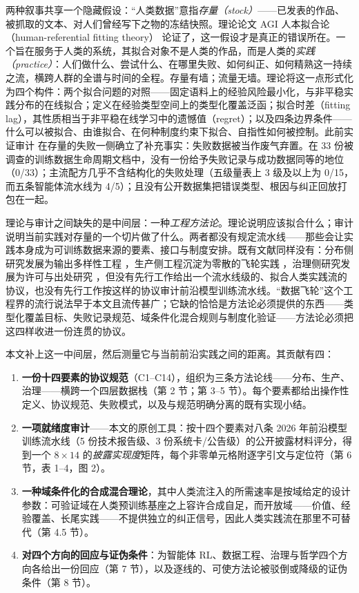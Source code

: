 \documentclass[10pt,fontset=fandol]{ctexart}
\begin{document}
两种叙事共享一个隐藏假设：“人类数据”意指\emph{存量（stock）}——已发表的作品、被抓取的文本、对人们曾经写下之物的冻结快照。理论论文 AGI 人本拟合论（human-referential fitting theory）\cite{ref5} 论证了，这一假设才是真正的错误所在。一个旨在服务于人类的系统，其拟合对象不是人类的作品，而是人类的\emph{实践（practice）}：人们做什么、尝试什么、在哪里失败、如何纠正、如何精熟这一持续之流，横跨人群的全谱与时间的全程。存量有墙；流量无墙。理论将这一点形式化为四个构件：两个拟合问题的对照——固定语料上的经验风险最小化，与非平稳实践分布的在线拟合；定义在经验类型空间上的类型化覆盖泛函；拟合时差（fitting lag），其性质相当于非平稳在线学习中的遗憾值（regret）；以及四条边界条件——什么可以被拟合、由谁拟合、在何种制度约束下拟合、自指性如何被控制。此前实证审计 \cite{ref6} 在存量的失败一侧确立了补充事实：失败数据被当作废气弃置。在 33 份被调查的训练数据生命周期文档中，没有一份给予失败记录与成功数据同等的地位（0/33）；主流配方几乎不含结构化的失败处理（五级量表上 3 级及以上为 0/15，而五条智能体流水线为 4/5）；且没有公开数据集把错误类型、根因与纠正回放打包在一起。

理论与审计之间缺失的是中间层：一种\emph{工程方法论}。理论说明应该拟合什么；审计说明当前实践对存量的一个切片做了什么。两者都没有规定流水线——那些会让实践本身成为可训练数据来源的要素、接口与制度安排。既有文献同样没有：分布侧研究发展为输出多样性工程 \cite{ref7}，生产侧工程沉淀为零散的飞轮实践 \cite{ref8}，治理侧研究发展为许可与出处研究 \cite{ref9,ref10}，但没有先行工作给出一个流水线级的、拟合人类实践流的协议，也没有先行工作按这样的协议审计前沿模型训练流水线。“数据飞轮”这个工程界的流行说法早于本文且流传甚广；它缺的恰恰是方法论必须提供的东西——类型化覆盖目标、失败记录规范、域条件化混合规则与制度化验证——方法论必须把这四样收进一份连贯的协议。

本文补上这一中间层，然后测量它与当前前沿实践之间的距离。其贡献有四：

\begin{enumerate}
\item \textbf{一份十四要素的协议规范}（C1--C14），组织为三条方法论线——分布、生产、治理——横跨一个四层数据栈（第 2 节；第 3--5 节）。每个要素都给出操作性定义、协议规范、失败模式，以及与规范明确分离的既有实现小结。
\item \textbf{一项就绪度审计}——本文的原创工具：按十四个要素对八条 2026 年前沿模型训练流水线（5 份技术报告级、3 份系统卡/公告级）的公开披露材料评分，得到一个 $8\times14$ 的\emph{披露实现度}矩阵，每个非零单元格附逐字引文与定位符（第 6 节，表 1--4，图 2）。
\item \textbf{一种域条件化的合成混合理论}，其中人类流注入的所需速率是按域给定的设计参数：可验证域在人类预训练基座之上容许合成自足，而开放域——价值、经验覆盖、长尾实践——不提供独立的纠正信号，因此人类实践流在那里不可替代（第 4.5 节）。
\item \textbf{对四个方向的回应与证伪条件}：为智能体 RL、数据工程、治理与哲学四个方向各给出一份回应（第 7 节），以及逐线的、可使方法论被驳倒或降级的证伪条件（第 8 节）。
\end{enumerate}
\end{document}
